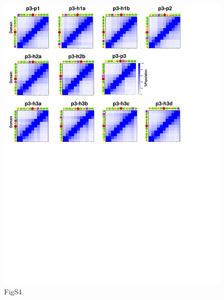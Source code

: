 \documentclass[10pt,letterpaper]{article}
\begin{document}
\begin{figure}[!ht]
\includegraphics[scale=0.5,width=\textwidth,trim={0 0cm 0 0cm},clip]{./figures/S4.pdf}
\caption{{FigS4}}
\end{figure}
\end{document}
